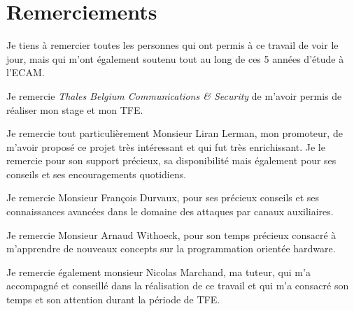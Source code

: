 \documentclass[oneside]{book}
\begin{document}
\newpage
\strut
\thispagestyle{empty}
\newpage



\chapter*{Remerciements}

Je tiens à remercier toutes les personnes qui ont permis à ce travail de voir le jour, mais qui m’ont également soutenu tout au long de ces 5 années d’étude à l’ECAM.

Je remercie \textit{Thales Belgium Communications \& Security} de m’avoir permis de réaliser mon stage et mon TFE.

Je remercie tout particulièrement Monsieur Liran Lerman, mon promoteur, de m’avoir proposé ce projet très intéressant et qui fut très enrichissant. Je le remercie pour son support précieux, sa disponibilité mais également pour ses conseils et ses encouragements quotidiens.

Je remercie Monsieur François Durvaux, pour ses précieux conseils et ses connaissances avancées dans le domaine des attaques par canaux auxiliaires.

Je remercie Monsieur Arnaud Withoeck, pour son temps précieux consacré à m'apprendre de nouveaux concepts sur la programmation orientée hardware. 

Je remercie également monsieur Nicolas Marchand, ma tuteur, qui m’a accompagné et conseillé dans la réalisation de ce travail et qui m’a consacré son temps et son attention durant la période de TFE.

\newpage


{} %
\end{document}
